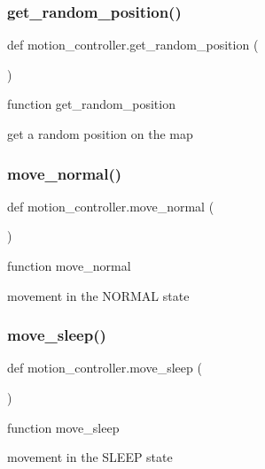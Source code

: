 \subsubsection{\texorpdfstring{get\+\_\+random\+\_\+position()}{get\_random\_position()}}
{\footnotesize\ttfamily def motion\+\_\+controller.\+get\+\_\+random\+\_\+position (\begin{DoxyParamCaption}{ }\end{DoxyParamCaption})}



function get\+\_\+random\+\_\+position 

get a random position on the map \mbox{\label{namespacemotion__controller_ad0d79d45374055e40016deb85d442b68}} 
\subsubsection{\texorpdfstring{move\+\_\+normal()}{move\_normal()}}
{\footnotesize\ttfamily def motion\+\_\+controller.\+move\+\_\+normal (\begin{DoxyParamCaption}{ }\end{DoxyParamCaption})}



function move\+\_\+normal 

movement in the N\+O\+R\+M\+AL state \mbox{\label{namespacemotion__controller_aa7f1f1344aaf5e6d83f0969cd68f4d85}} 
\subsubsection{\texorpdfstring{move\+\_\+sleep()}{move\_sleep()}}
{\footnotesize\ttfamily def motion\+\_\+controller.\+move\+\_\+sleep (\begin{DoxyParamCaption}{ }\end{DoxyParamCaption})}



function move\+\_\+sleep 

movement in the S\+L\+E\+EP state \mbox{\label{namespacemotion__controller_af23057c8b423f4c23d2d6b61fa38c2f6}} 
